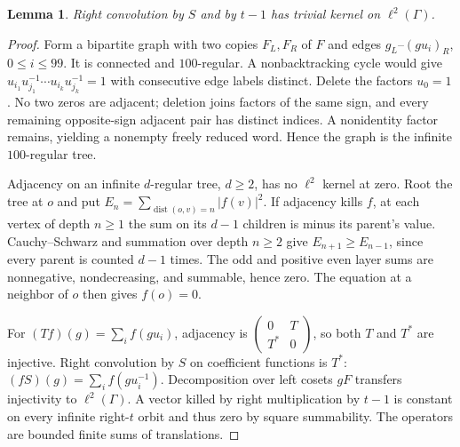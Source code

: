 \documentclass[11pt]{article}
\newtheorem{lemma}[theorem]{Lemma}
\theoremstyle{remark}\newtheorem{remark}[theorem]{Remark}
\begin{document}
\begin{lemma}\label{lem:operator}
Right convolution by $S$ and by $t-1$ has trivial kernel on $\ell^2(\Gamma)$.
\end{lemma}
\begin{proof}
Form a bipartite graph with two copies $F_L,F_R$ of $F$ and edges $g_L$--$(gu_i)_R$, $0\leq i\leq99$. It is connected and $100$-regular. A nonbacktracking cycle would give $u_{i_1}u_{j_1}^{-1}\cdots u_{i_k}u_{j_k}^{-1}=1$ with consecutive edge labels distinct. Delete the factors $u_0=1$. No two zeros are adjacent; deletion joins factors of the same sign, and every remaining opposite-sign adjacent pair has distinct indices. A nonidentity factor remains, yielding a nonempty freely reduced word. Hence the graph is the infinite $100$-regular tree.

Adjacency on an infinite $d$-regular tree, $d\geq2$, has no $\ell^2$ kernel at zero. Root the tree at $o$ and put $E_n=\sum_{\operatorname{dist}(o,v)=n}|f(v)|^2$. If adjacency kills $f$, at each vertex of depth $n\geq1$ the sum on its $d-1$ children is minus its parent's value. Cauchy--Schwarz and summation over depth $n\geq2$ give $E_{n+1}\geq E_{n-1}$, since every parent is counted $d-1$ times. The odd and positive even layer sums are nonnegative, nondecreasing, and summable, hence zero. The equation at a neighbor of $o$ then gives $f(o)=0$.

For $(Tf)(g)=\sum_i f(gu_i)$, adjacency is $\left(\begin{smallmatrix}0&T\\T^*&0\end{smallmatrix}\right)$, so both $T$ and $T^*$ are injective. Right convolution by $S$ on coefficient functions is $T^*$: $(fS)(g)=\sum_i f(gu_i^{-1})$. Decomposition over left cosets $gF$ transfers injectivity to $\ell^2(\Gamma)$. A vector killed by right multiplication by $t-1$ is constant on every infinite right-$t$ orbit and thus zero by square summability. The operators are bounded finite sums of translations.
\end{proof}
\end{document}
